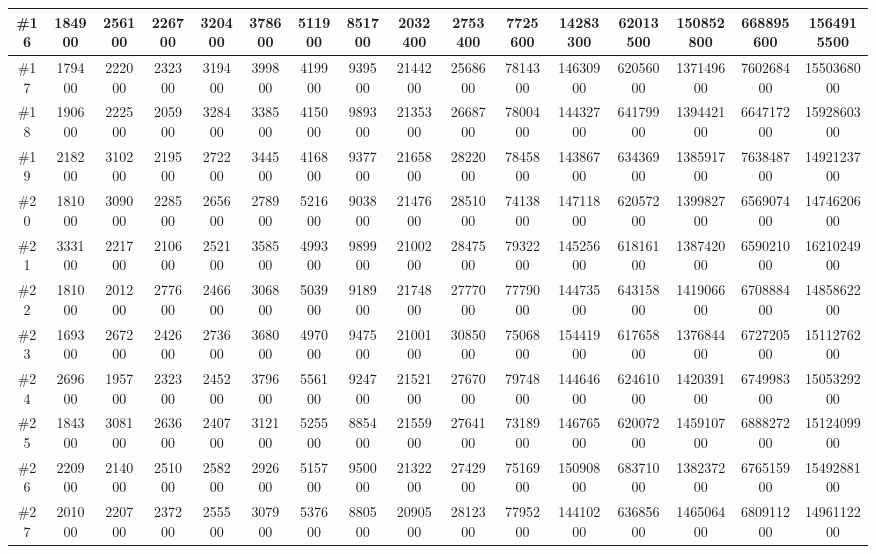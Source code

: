 \documentclass[titlepage]{article}
\begin{document}
\begin{landscape}
\begin{table}[h]
\begin{tabular}{|c|c|c|c|c|c|c|c|c|c|c|c|c|c|c|c|}
			\hline
			\#16     & 184900 & 256100 & 226700 & 320400 & 378600 & 511900 & 851700  & 2032400 & 2753400 & 7725600 & 14283300 & 62013500 & 150852800 & 668895600 & 1564915500  \\ 
			\hline
			\#17     & 179400 & 222000 & 232300 & 319400 & 399800 & 419900 & 939500  & 2144200 & 2568600 & 7814300 & 14630900 & 62056000 & 137149600 & 760268400 & 1550368000  \\ 
			\hline
			\#18     & 190600 & 222500 & 205900 & 328400 & 338500 & 415000 & 989300  & 2135300 & 2668700 & 7800400 & 14432700 & 64179900 & 139442100 & 664717200 & 1592860300  \\ 
			\hline
			\#19     & 218200 & 310200 & 219500 & 272200 & 344500 & 416800 & 937700  & 2165800 & 2822000 & 7845800 & 14386700 & 63436900 & 138591700 & 763848700 & 1492123700  \\ 
			\hline
			\#20     & 181000 & 309000 & 228500 & 265600 & 278900 & 521600 & 903800  & 2147600 & 2851000 & 7413800 & 14711800 & 62057200 & 139982700 & 656907400 & 1474620600  \\ 
			\hline
			\#21     & 333100 & 221700 & 210600 & 252100 & 358500 & 499300 & 989900  & 2100200 & 2847500 & 7932200 & 14525600 & 61816100 & 138742000 & 659021000 & 1621024900  \\ 
			\hline
			\#22     & 181000 & 201200 & 277600 & 246600 & 306800 & 503900 & 918900  & 2174800 & 2777000 & 7779000 & 14473500 & 64315800 & 141906600 & 670888400 & 1485862200  \\ 
			\hline
			\#23     & 169300 & 267200 & 242600 & 273600 & 368000 & 497000 & 947500  & 2100100 & 3085000 & 7506800 & 15441900 & 61765800 & 137684400 & 672720500 & 1511276200  \\ 
			\hline
			\#24     & 269600 & 195700 & 232300 & 245200 & 379600 & 556100 & 924700  & 2152100 & 2767000 & 7974800 & 14464600 & 62461000 & 142039100 & 674998300 & 1505329200  \\ 
			\hline
			\#25     & 184300 & 308100 & 263600 & 240700 & 312100 & 525500 & 885400  & 2155900 & 2764100 & 7318900 & 14676500 & 62007200 & 145910700 & 688827200 & 1512409900  \\ 
			\hline
			\#26     & 220900 & 214000 & 251000 & 258200 & 292600 & 515700 & 950000  & 2132200 & 2742900 & 7516900 & 15090800 & 68371000 & 138237200 & 676515900 & 1549288100  \\ 
			\hline
			\#27     & 201000 & 220700 & 237200 & 255500 & 307900 & 537600 & 880500  & 2090500 & 2812300 & 7795200 & 14410200 & 63685600 & 146506400 & 680911200 & 1496112200  \\ 

\end{tabular}
\end{table}
\end{landscape}
\end{document}
